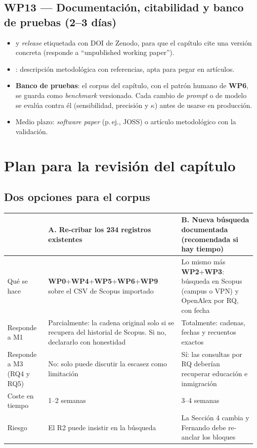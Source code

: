\documentclass[11pt,a4paper]{article}
\newcommand{\WP}[1]{\textbf{\textcolor{palet}{WP#1}}}
\begin{document}
\subsection*{\WP{13} — Documentación, citabilidad y banco de pruebas (2--3 días)}
\begin{itemize}
  \item {} y \emph{release} etiquetada con DOI de Zenodo, para que el capítulo cite una versión concreta (responde a ``unpublished working paper'').
  \item {}: descripción metodológica con referencias, apta para pegar en artículos.
  \item \textbf{Banco de pruebas}: el corpus del capítulo, con el patrón humano de \WP{6}, se guarda como \emph{benchmark} versionado. Cada cambio de \emph{prompt} o de modelo se evalúa contra él (sensibilidad, precisión y $\kappa$) antes de usarse en producción.
  \item Medio plazo: \emph{software paper} (p.\,ej., JOSS) o artículo metodológico con la validación.
\end{itemize}

\section{Plan para la revisión del capítulo}\label{sec:capitulo}

\subsection{Dos opciones para el corpus}

\begin{center}
\begin{tabularx}{\linewidth}{p{3.2cm}XX}
\toprule
 & \textbf{A. Re-cribar los 234 registros existentes} & \textbf{B. Nueva búsqueda documentada (recomendada si hay tiempo)}\\
\midrule
Qué se hace & \WP{0}+\WP{4}+\WP{5}+\WP{6}+\WP{9} sobre el CSV de Scopus importado & Lo mismo más \WP{2}+\WP{3}: búsqueda en Scopus (campus o VPN) y OpenAlex por RQ, con fecha\\
Responde a M1 & Parcialmente: la cadena original solo si se recupera del historial de Scopus. Si no, declararlo con honestidad & Totalmente: cadenas, fechas y recuentos exactos\\
Responde a M3 (RQ4 y RQ5) & No: solo puede discutir la escasez como limitación & Sí: las consultas por RQ deberían recuperar educación e inmigración\\
Coste en tiempo & 1--2 semanas & 3--4 semanas\\
Riesgo & El R2 puede insistir en la búsqueda & La Sección 4 cambia y Fernando debe re-anclar los bloques\\
\bottomrule
\end{tabularx}
\end{center}
\end{document}

